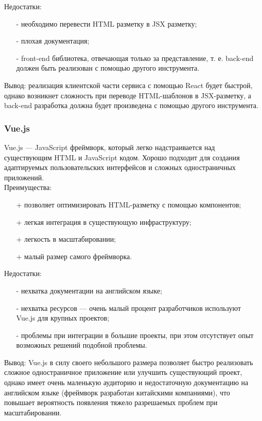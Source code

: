 \documentclass[a4paper,12pt]{article}
\begin{document}
Недостатки:
\begin{itemize}
	\item[-] необходимо перевести HTML разметку в JSX разметку;
	\item[-] плохая документация;
	\item[-] front-end библиотека, отвечающая только за представление, т. е. back-end должен быть реализован с помощью другого инструмента.
\end{itemize}

Вывод: реализация клиентской части сервиса с помощью React будет быстрой, однако возникнет сложность при переводе HTML-шаблонов в JSX-разметку, а back-end разработка должна будет произведена с помощью другого инструмента.\\



\subsubsection{Vue.js}

Vue.js — JavaScript фреймворк, который легко надстраивается над существующим HTML и JavaScript кодом. Хорошо подходит для создания адаптируемых пользовательских интерфейсов и сложных одностраничных приложений. \cite{website:medium}\\
Преимущества:
\begin{itemize}
	\item[+] позволяет оптимизировать HTML-разметку с помощью компонентов;
	\item[+] легкая интеграция в существующую инфраструктуру;
	\item[+] легкость в масштабировании;
	\item[+] малый размер самого фреймворка.
\end{itemize}

Недостатки:
\begin{itemize}
	\item[-] нехватка документации на английском языке;
	\item[-] нехватка ресурсов — очень малый процент разработчиков используют Vue.js для крупных проектов;
	\item[-] проблемы при интеграции в большие проекты, при этом отсутствует опыт возможных решений подобной проблемы.
\end{itemize}

Вывод: Vue.js в силу своего небольшого размера позволяет быстро реализовать сложное одностраничное приложение или улучшить существующий проект, однако имеет очень маленькую аудиторию и недостаточную документацию на английском языке (фреймворк разработан китайскими компаниями), что повышает вероятность появления тяжело разрешаемых проблем при масштабировании.\\
\end{document}
